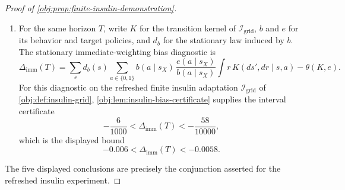 \begin{proof}[Proof of \cref{obj:prop:finite-insulin-demonstration}]
\begin{enumerate}
\item For the same horizon \(T\), write \(K\) for the transition kernel of \(\mathcal I_{\mathrm{grid}}\), \(b\) and \(e\) for its behavior and target policies, and \(d_b\) for the stationary law induced by \(b\). The stationary immediate-weighting bias diagnostic is
\[
\Delta_{\mathrm{imm}}(T)
=
\sum_s d_b(s)
\sum_{a\in\{0,1\}}
b(a\mid s_X)\,
\frac{e(a\mid s_X)}{b(a\mid s_X)}
\int r\,K(ds',dr\mid s,a)
-
\theta(K,e).
\]
For this diagnostic on the refreshed finite insulin adaptation \(\mathcal I_{\mathrm{grid}}\) of \cref{obj:def:insulin-grid}, \cref{obj:lem:insulin-bias-certificate} supplies the interval certificate
\[
-\frac6{1000}
<
\Delta_{\mathrm{imm}}(T)
<
-\frac{58}{10000},
\]
which is the displayed bound
\[
-0.006<\Delta_{\mathrm{imm}}(T)<-0.0058.
\]
\end{enumerate}

The five displayed conclusions are precisely the conjunction asserted for the refreshed insulin experiment. %
\end{proof}
